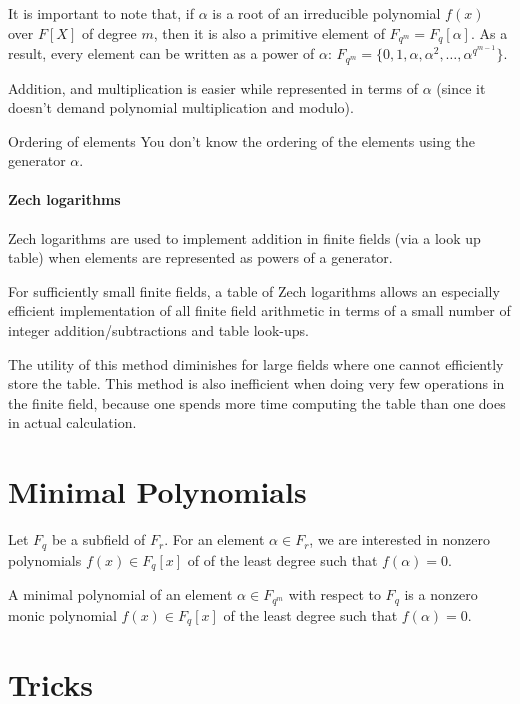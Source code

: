 It is important to note that, if $\alpha$ is a 
root of an irreducible polynomial $f(x)$ over $F[X]$ of degree $m$, 
then it is also a primitive element of $F_{q^m}=F_q[\alpha]$.
As a result, every element can be written as a power of $\alpha$: 
$F_{q^m}=\{0,1,\alpha,\alpha^2,\dots,\alpha^{q^{m-1}}\}$.

Addition, and multiplication is easier while represented in terms of $\alpha$ 
(since it doesn't demand polynomial multiplication and modulo).

\begin{notice}{Ordering of elements}
    You don't know the ordering of the elements using the generator $\alpha$.
\end{notice}

\paragraph{Zech logarithms}
Zech logarithms are used to implement addition in finite fields 
(via a look up table)
when elements are represented as powers of a generator. 

For sufficiently small finite fields,
 a table of Zech logarithms allows an especially efficient 
 implementation of all finite field arithmetic in terms of a small 
 number of integer addition/subtractions and table look-ups.

The utility of this method diminishes for large fields 
where one cannot efficiently store the table. 
This method is also inefficient when doing very few 
operations in the finite field, because one spends more time 
computing the table than one does in actual calculation.


\section{Minimal Polynomials}

Let $F_q$ be a subfield of $F_r$. For an element $\alpha\in F_r$,
we are interested in nonzero
polynomials $f(x)\in F_q[x]$ of of the least degree such that $f(\alpha)=0$.
\begin{definition}
    A minimal polynomial of an element $\alpha\in F_{q^m}$ 
    with respect to $F_q$ is a nonzero monic polynomial 
    $f(x)\in F_q[x]$ of the least degree such that $f(\alpha)=0$.
\end{definition}


\section{Tricks}
